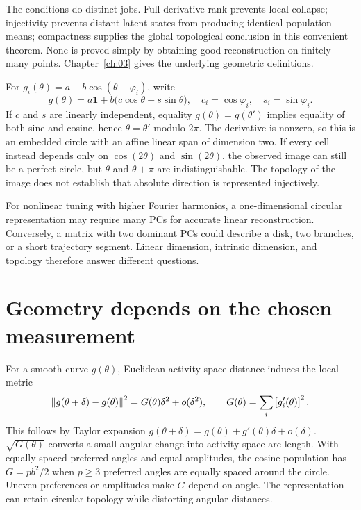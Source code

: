 The conditions do distinct jobs. Full derivative rank prevents local collapse; injectivity prevents distant latent states from producing identical population means; compactness supplies the global topological conclusion in this convenient theorem. None is proved simply by obtaining good reconstruction on finitely many points. Chapter~\ref{ch:03} gives the underlying geometric definitions.

\begin{example}
For $g_i(\theta)=a+b\cos(\theta-\varphi_i)$, write
\[
 g(\theta)=a\mathbf1+b\big(c\cos\theta+s\sin\theta\big),
 \quad c_i=\cos\varphi_i,\quad s_i=\sin\varphi_i.
\]
If $c$ and $s$ are linearly independent, equality $g(\theta)=g(\theta')$ implies equality of both sine and cosine, hence $\theta=\theta'$ modulo $2\pi$. The derivative is nonzero, so this is an embedded circle with an affine linear span of dimension two.
If every cell instead depends only on $\cos(2\theta)$ and $\sin(2\theta)$, the observed image can still be a perfect circle, but $\theta$ and $\theta+\pi$ are indistinguishable. The topology of the image does not establish that absolute direction is represented injectively.
\end{example}

For nonlinear tuning with higher Fourier harmonics, a one-dimensional circular representation may require many PCs for accurate linear reconstruction. Conversely, a matrix with two dominant PCs could describe a disk, two branches, or a short trajectory segment. Linear dimension, intrinsic dimension, and topology therefore answer different questions.

\section{Geometry depends on the chosen measurement}
For a smooth curve $g(\theta)$, Euclidean activity-space distance induces the local metric
\begin{equation}
 \left\lVert g(\theta+\delta)-g(\theta)\right\rVert^2
   =G(\theta)\delta^2+o(\delta^2),
 \qquad G(\theta)=\sum_i\left[g_i'(\theta)\right]^2.
 \label{eq:08-induced-metric}
\end{equation}
This follows by Taylor expansion $g(\theta+\delta)=g(\theta)+g'(\theta)\delta+o(\delta)$. $\sqrt{G(\theta)}$ converts a small angular change into activity-space arc length. With equally spaced preferred angles and equal amplitudes, the cosine population has $G=pb^2/2$ when $p\geq3$ preferred angles are equally spaced around the circle. Uneven preferences or amplitudes make $G$ depend on angle. The representation can retain circular topology while distorting angular distances.

